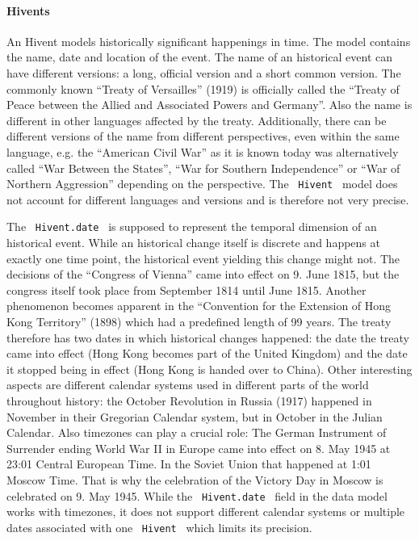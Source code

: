 \paragraph{Hivents} %
\label{par:evaluation_hivents}

An Hivent models historically significant happenings in time. The model contains the name, date and location of the event. The name of an historical event can have different versions: a long, official version and a short common version. The commonly known ``Treaty of Versailles'' (1919) is officially called the ``Treaty of Peace between the Allied and Associated Powers and Germany''. Also the name is different in other languages affected by the treaty. Additionally, there can be different versions of the name from different perspectives, even within the same language, e.g. the ``American Civil War'' as it is known today was alternatively called ``War Between the States'', ``War for Southern Independence'' or ``War of Northern Aggression'' depending on the perspective.
The ~\texttt{Hivent}~ model does not account for different languages and versions and is therefore not very precise.

The ~\texttt{Hivent.date}~ is supposed to represent the temporal dimension of an historical event. While an historical change itself is discrete and happens at exactly one time point, the historical event yielding this change might not. The decisions of the ``Congress of Vienna'' came into effect on 9. June 1815, but the congress itself took place from September 1814 until June 1815. Another phenomenon becomes apparent in the ``Convention for the Extension of Hong Kong Territory'' (1898) which had a predefined length of 99 years. The treaty therefore has two dates in which historical changes happened: the date the treaty came into effect (Hong Kong becomes part of the United Kingdom) and the date it stopped being in effect (Hong Kong is handed over to China). Other interesting aspects are different calendar systems used in different parts of the world throughout history: the October Revolution in Russia (1917) happened in November in their Gregorian Calendar system, but in October in the Julian Calendar. Also timezones can play a crucial role: The German Instrument of Surrender ending World War II in Europe came into effect on 8. May 1945 at 23:01 Central European Time. In the Soviet Union that happened at 1:01 Moscow Time. That is why the celebration of the Victory Day in Moscow is celebrated on 9. May 1945. While the ~\texttt{Hivent.date}~ field in the data model works with timezones, it does not support different calendar systems or multiple dates associated with one ~\texttt{Hivent}~ which limits its precision.

